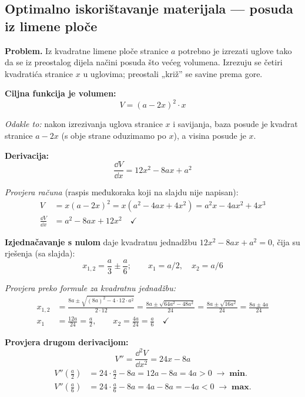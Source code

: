 \subsection{Optimalno iskorištavanje materijala --- posuda iz limene ploče}

\textbf{Problem.} Iz kvadratne limene ploče stranice $a$ potrebno je izrezati
uglove tako da se iz preostalog dijela načini posuda što većeg volumena.
Izrezuju se četiri kvadratića stranice $x$ u uglovima; preostali „križ” se
savine prema gore.

\textbf{Ciljna funkcija je volumen:}
\[
V = (a - 2x)^2 \cdot x
\]

\emph{Odakle to:} nakon izrezivanja uglova stranice $x$ i savijanja, baza posude
je kvadrat stranice $a - 2x$ (s obje strane oduzimamo po $x$), a visina posude
je $x$.

\textbf{Derivacija:}
\[
\frac{\dd V}{\dd x} = 12x^2 - 8ax + a^2
\]

\emph{Provjera računa} (raspis međukoraka koji na slajdu nije napisan):
\begin{align}
V &= x(a-2x)^2 = x(a^2 - 4ax + 4x^2) = a^2 x - 4a x^2 + 4x^3 \\
\frac{\dd V}{\dd x} &= a^2 - 8ax + 12x^2 \quad \checkmark
\end{align}

\textbf{Izjednačavanje s nulom} daje kvadratnu jednadžbu
$12x^2 - 8ax + a^2 = 0$, čija su rješenja (sa slajda):
\[
x_{1,2} = \frac{a}{3} \pm \frac{a}{6}; \qquad x_1 = a/2, \quad x_2 = a/6
\]

\emph{Provjera preko formule za kvadratnu jednadžbu:}
\begin{align}
x_{1,2} &= \frac{8a \pm \sqrt{(8a)^2 - 4\cdot 12 \cdot a^2}}{2 \cdot 12}
= \frac{8a \pm \sqrt{64a^2 - 48a^2}}{24}
= \frac{8a \pm \sqrt{16a^2}}{24}
= \frac{8a \pm 4a}{24} \\
x_1 &= \frac{12a}{24} = \frac{a}{2}, \qquad
x_2 = \frac{4a}{24} = \frac{a}{6} \quad \checkmark
\end{align}

\textbf{Provjera drugom derivacijom:}
\[
V'' = \frac{\dd^2 V}{\dd x^2} = 24x - 8a
\]
\begin{align}
V''\!\left(\tfrac{a}{2}\right) &= 24 \cdot \tfrac{a}{2} - 8a = 12a - 8a = 4a > 0
\;\to\; \textbf{min.} \\
V''\!\left(\tfrac{a}{6}\right) &= 24 \cdot \tfrac{a}{6} - 8a = 4a - 8a = -4a < 0
\;\to\; \textbf{max.}
\end{align}

